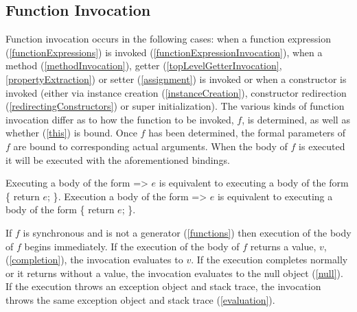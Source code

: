 \documentclass{article}
\newcommand{\code}[1]{{\sf #1}}
\begin{document}
\subsection{ Function Invocation}

\LMHash{}
Function invocation occurs in the following cases: when a function expression  (\ref{functionExpressions}) is invoked (\ref{functionExpressionInvocation}), when a method (\ref{methodInvocation}), getter (\ref{topLevelGetterInvocation}, \ref{propertyExtraction}) or setter (\ref{assignment}) is invoked or when a constructor is invoked (either via instance creation (\ref{instanceCreation}), constructor redirection (\ref{redirectingConstructors}) or super initialization). The various kinds of function invocation differ as to how the function to be invoked, $f$,  is determined, as well as whether \THIS{} (\ref{this}) is bound. Once $f$ has been determined, the formal parameters of $f$ are bound to corresponding actual arguments. When the body of $f$ is executed it will be executed with the aforementioned bindings.

\LMHash{}
Executing a body of the form \code{=> $e$} is equivalent to executing a body of the form \code{\{ return $e$; \}}.
Execution a body of the form \code{\ASYNC{} => $e$} is equivalent to executing a body of the form \code{\ASYNC{} \{ return $e$; \}}.

\LMHash{}
If $f$ is synchronous and is not a generator (\ref{functions}) then execution of the body of $f$ begins immediately.
If the execution of the body of $f$ returns a value, $v$, (\ref{completion}), the invocation evaluates to $v$.
If the execution completes normally or it returns without a value, the invocation evaluates to the null object (\ref{null}).
If the execution throws an exception object and stack trace, the invocation throws the same exception object and stack trace (\ref{evaluation}).

\end{document}
